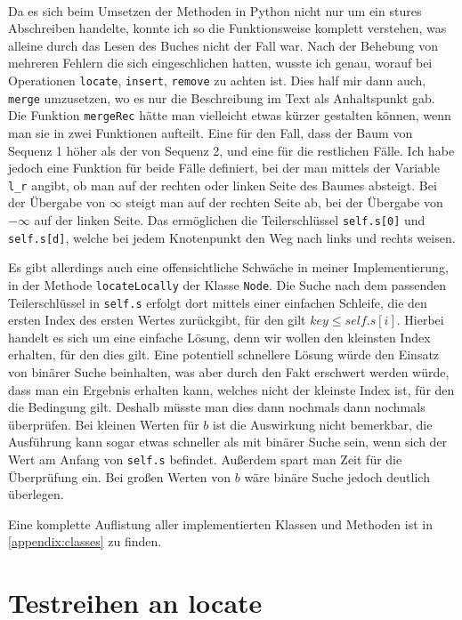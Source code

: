 \\
Da es sich beim Umsetzen der Methoden in Python nicht nur um ein stures Abschreiben handelte, konnte ich so die Funktionsweise komplett verstehen, was alleine durch das Lesen des Buches nicht der Fall war. Nach der Behebung von mehreren Fehlern die sich eingeschlichen hatten, wusste ich genau, worauf bei Operationen \texttt{locate}, \texttt{insert}, \texttt{remove} zu achten ist. Dies half mir dann auch, \texttt{merge} umzusetzen, wo es nur die Beschreibung im Text als Anhaltspunkt gab. Die Funktion \texttt{mergeRec} hätte man vielleicht etwas kürzer gestalten können, wenn man sie in zwei Funktionen aufteilt. Eine für den Fall, dass der Baum von Sequenz 1 höher als der von Sequenz 2, und eine für die restlichen Fälle. Ich habe jedoch eine Funktion für beide Fälle definiert, bei der man mittels der Variable \texttt{l\_r} angibt, ob man auf der rechten oder linken Seite des Baumes absteigt. Bei der Übergabe von $\infty$ steigt man auf der rechten Seite ab, bei der Übergabe von $-\infty$ auf der linken Seite. Das ermöglichen die Teilerschlüssel \texttt{self.s[0]} und \texttt{self.s[d]}, welche bei jedem Knotenpunkt den Weg nach links und rechts weisen.
\par
Es gibt allerdings auch eine offensichtliche Schwäche in meiner Implementierung, in der Methode \texttt{locateLocally} der Klasse \texttt{Node}. Die Suche nach dem passenden Teilerschlüssel in \texttt{self.s} erfolgt dort mittels einer einfachen Schleife, die den ersten Index des ersten Wertes zurückgibt, für den gilt \texttt{$key \leq self.s[i]$}. Hierbei handelt es sich um eine einfache Lösung, denn wir wollen den kleinsten Index erhalten, für den dies gilt. Eine potentiell schnellere Lösung würde den Einsatz von binärer Suche beinhalten, was aber durch den Fakt erschwert werden würde, dass man ein Ergebnis erhalten kann, welches nicht der kleinste Index ist, für den die Bedingung gilt. Deshalb müsste man dies dann nochmals dann nochmals überprüfen. Bei kleinen Werten für $b$ ist die Auswirkung nicht bemerkbar, die Ausführung kann sogar etwas schneller als mit binärer Suche sein, wenn sich der Wert am Anfang von \texttt{self.s} befindet. Außerdem spart man Zeit für die Überprüfung ein. Bei großen Werten von $b$ wäre binäre Suche jedoch deutlich überlegen.
\par
Eine komplette Auflistung aller implementierten Klassen und Methoden ist in \autoref{appendix:classes} zu finden.

\section{Testreihen an locate}
\label{chapter:benchmarks}

